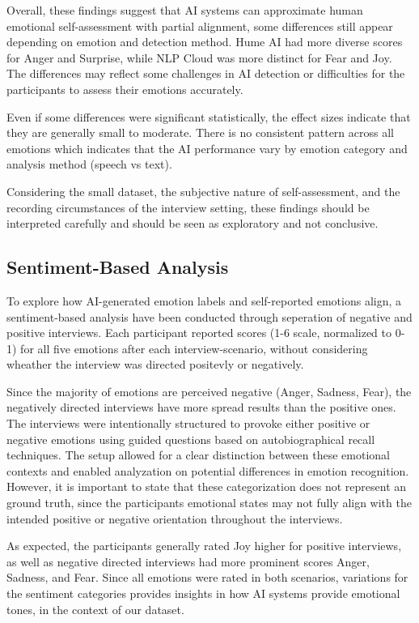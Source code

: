 \medskip
Overall, these findings suggest that AI systems can approximate human emotional self-assessment with partial alignment, some differences still appear depending on emotion and detection method. 
Hume AI had more diverse scores for Anger and Surprise, while NLP Cloud was more distinct for Fear and Joy. The differences may reflect some challenges in AI detection or difficulties for the participants to assess their emotions accurately. 

Even if some differences were significant statistically, the effect sizes indicate that they are generally small to moderate. There is no consistent pattern across all emotions which indicates that the AI performance vary by emotion category and analysis method (speech vs text).
\medskip

Considering the small dataset, the subjective nature of self-assessment, and the recording circumstances of the interview setting, these findings should be interpreted 
carefully and should be seen as exploratory and not conclusive. 


\subsection{Sentiment-Based Analysis}
To explore how AI-generated emotion labels and self-reported emotions align, a sentiment-based analysis have been conducted through seperation of negative and positive interviews. 
Each participant reported scores (1-6 scale, normalized to 0-1) for all five emotions after each interview-scenario, without considering wheather the interview was directed positevly or negatively. 

Since the majority of emotions are perceived negative (Anger, Sadness, Fear), the negatively directed interviews have more spread results than the positive ones. 
The interviews were intentionally structured to provoke either positive or negative emotions using guided questions based on autobiographical recall techniques. 
The setup allowed for a clear distinction between these emotional contexts and enabled analyzation on potential differences in emotion recognition. 
However, it is important to state that these categorization does not represent an ground truth, since the participants emotional states may not fully align with the intended positive or negative orientation throughout the interviews. 

As expected, the participants generally rated Joy higher for positive interviews, as well as negative directed interviews had more prominent scores Anger, Sadness, and Fear. 
Since all emotions were rated in both scenarios, variations for the sentiment categories provides insights in how AI systems provide emotional tones, in the context of our dataset. 

